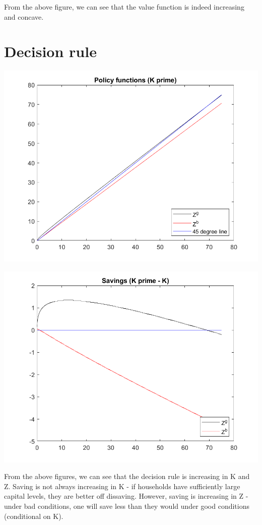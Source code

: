 \documentclass[11pt]{article} %
\begin{document}
From the above figure, we can see that the value function is indeed increasing and concave.


\section{Decision rule}
\includegraphics{policy}

\includegraphics{savings}

From the above figures, we can see that the decision rule is increasing in K and Z. Saving is not always increasing in K - if households have sufficiently large capital levels, they are better off dissaving. However, saving is increasing in Z - under bad conditions, one will save less than they would under good conditions (conditional on K).
\end{document}
